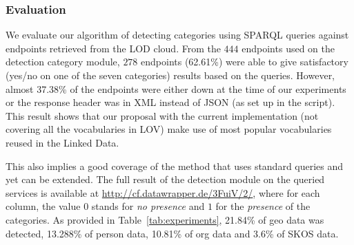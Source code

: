 \subsubsection{Evaluation }
We evaluate our algorithm of detecting categories using SPARQL queries against endpoints retrieved from the LOD cloud. From the $444$ endpoints used on the detection category module, $278$ endpoints (62.61\%) were able to give satisfactory (yes/no on one of the seven categories) results based on the queries. However, almost 37.38\% of the endpoints were either down at the time of our experiments or the response header was in XML instead of JSON (as set up in the script). This result shows that our proposal with the current implementation (not covering all the vocabularies in LOV) make use of most popular vocabularies reused in the Linked Data.
\begin{table}[!htbp]
\end{table}

This also implies a good coverage of the method that uses standard queries and yet can be extended. The full result of the detection module on the queried services is available at \url{http://cf.datawrapper.de/3FuiV/2/}, where for each column, the value $0$ stands for \textit{no presence} and $1$ for the \textit{presence} of the categories. As provided in Table~\ref{tab:experiments}, 21.84\% of geo data was detected, 13.288\% of person data, 10.81\% of org data and 3.6\% of SKOS data.

